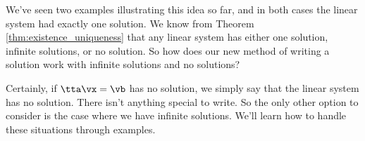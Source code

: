 We've seen two examples illustrating this idea so far, and in both cases the linear system had exactly one solution. We know from Theorem \ref{thm:existence_uniqueness} that any linear system has either one solution, infinite solutions, or no solution. So how does our new method of writing a solution work with infinite solutions and no solutions?

Certainly, if $\tta\vx=\vb$ has no solution, we simply say that the linear system has no solution. There isn't anything special to write. So the only other option to consider is the case where we have infinite solutions. We'll learn how to handle these situations through examples.

\medskip

